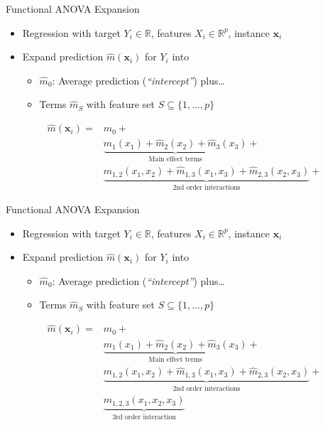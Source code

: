 \documentclass[aspectratio=169,12pt]{beamer}
\providecommand{\tightlist}{%
  \setlength{\itemsep}{2pt}\setlength{\parskip}{0pt}}
\begin{document}
\begin{frame}{Functional ANOVA Expansion}
\label{functional-anova-expansion-1}
\begin{itemize}
\tightlist
\item
  Regression with target \(Y_i \in \mathbb{R}\), features
  \(X_i \in \mathbb{R}^p\), instance \(\mathbf{x}_i\)
\item
  Expand prediction \(\hat{m}(\mathbf{x}_i)\) for \(Y_i\) into

  \begin{itemize}
  \tightlist
  \item
    \(\hat{m}_{0}\): Average prediction (\emph{``intercept''})
    plus\ldots{}
  \item
    Terms \(\hat{m}_S\) with feature set
    \(S \subseteq \{1, \ldots, p\}\)
  \end{itemize}
\end{itemize}

\vfill

\begin{align*}
\hat{m}(\mathbf{x}_i) = & \hat{m}_{0} + \\
&  \underbrace{\hat{m}_1(x_1) + \hat{m}_2(x_2) + \hat{m}_3(x_3)}_{\text{Main effect terms}} + \\
&  \underbrace{\hat{m}_{1,2}(x_1,x_2) + \hat{m}_{1,3}(x_1,x_3) + \hat{m}_{2,3}(x_2,x_3)}_{\text{2nd order interactions}} +
\end{align*}
\end{frame}

\begin{frame}{Functional ANOVA Expansion}
\label{functional-anova-expansion-2}
\begin{itemize}
\tightlist
\item
  Regression with target \(Y_i \in \mathbb{R}\), features
  \(X_i \in \mathbb{R}^p\), instance \(\mathbf{x}_i\)
\item
  Expand prediction \(\hat{m}(\mathbf{x}_i)\) for \(Y_i\) into

  \begin{itemize}
  \tightlist
  \item
    \(\hat{m}_{0}\): Average prediction (\emph{``intercept''})
    plus\ldots{}
  \item
    Terms \(\hat{m}_S\) with feature set
    \(S \subseteq \{1, \ldots, p\}\)
  \end{itemize}
\end{itemize}

\vfill

\begin{align*}
\hat{m}(\mathbf{x}_i) = & \hat{m}_{0} + \\
&  \underbrace{\hat{m}_1(x_1) + \hat{m}_2(x_2) + \hat{m}_3(x_3)}_{\text{Main effect terms}} + \\
&  \underbrace{\hat{m}_{1,2}(x_1,x_2) + \hat{m}_{1,3}(x_1,x_3) + \hat{m}_{2,3}(x_2,x_3)}_{\text{2nd order interactions}} + \\ 
&  \underbrace{\hat{m}_{1,2,3}(x_1,x_2,x_3)}_{\text{3rd order interaction}}
\end{align*}
\end{frame}
\end{document}
